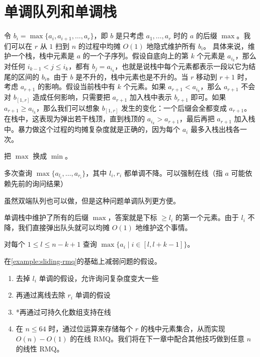 \section{单调队列和单调栈}

令 $b_i=\max\{a_i,a_{i+1},\ldots,a_r\}$，即 $b$ 是只考虑 $a_1,\ldots,a_r$ 时的 $a$ 的后缀 $\max$。我们可以在 $r$ 从 $1$ 扫到 $n$ 的过程中均摊 $O(1)$ 地隐式维护所有 $b_i$。
具体来说，维护一个栈，栈中元素是 $a$ 的一个子序列。假设自底向上的第 $k$ 个元素是 $a_{i_k}$，那么对任何 $i_{k-1}<j\le i_k$，都有 $b_j=a_{i_k}$，也就是说栈中每个元素都表示一段以它为结尾的区间的 $b_i$。由于 $b$ 是不升的，栈中元素也是不升的。当 $r$ 移动到 $r+1$ 时，考虑 $a_{r+1}$ 的影响。假设当前栈中有 $k$ 个元素。如果 $a_{r+1}<a_{i_k}$，那么 $a_{r+1}$ 不会对 $b_{[1,r]}$ 造成任何影响，只需要把 $a_{r+1}$ 加入栈中表示 $b_{r+1}$ 即可。如果 $a_{r+1}\ge a_{i_k}$，那么我们可以想象 $b_{[1,r]}$ 发生的变化：一个后缀会全都变成 $a_{r+1}$。在栈中，这表现为弹出若干栈顶，直到栈顶的 $a_{i_k}>a_{r+1}$，最后再把 $a_{r+1}$ 加入栈中。暴力做这个过程的均摊复杂度就是正确的，因为每个 $a_i$ 最多入栈出栈各一次。

\begin{exercise}
    把 $\max$ 换成 $\min$。
\end{exercise}

    \begin{example}\label{example:sliding-rmq}
    多次查询 $\max\{a_{l_i},\ldots,a_{r_i}\}$，其中 $l_i,r_i$ 都单调不降。可以强制在线（指 $a$ 可能依赖先前的询问结果）

    虽然双端队列也可以做，但是这种问题单调队列更方便。
    \end{example}
    \begin{solution}
        单调栈中维护了所有的后缀 $\max$，答案就是下标 $\ge l_i$ 的第一个元素。由于 $l_i$ 不降，我们直接弹出队头就可以均摊 $O(1)$ 地维护这个事情。
    \end{solution}
    \begin{exercise}[滑动窗口]
        对每个 $1\le l\le n-k+1$ 查询 $\max\{a_i\mid i\in [l,l+k-1]\}$。
    \end{exercise}
    \begin{exercise}\label{exercise:monotone-stack-rmq}
        在\cref{example:sliding-rmq}的基础上减弱问题的假设。
        \begin{enumerate}
            \item 去掉 $l_i$ 单调的假设，允许询问复杂度变大一些
            \item 再通过离线去除 $r_i$ 单调的假设
            \item *再通过可持久化数组支持在线
            \item 在 $n\le 64$ 时，通过位运算来存储每个 $r$ 的栈中元素集合，从而实现 $O(n)-O(1)$ 的在线 RMQ。我们将在下一章中配合其他技巧做到任意 $n$ 的线性 RMQ。
        \end{enumerate}
    \end{exercise}

